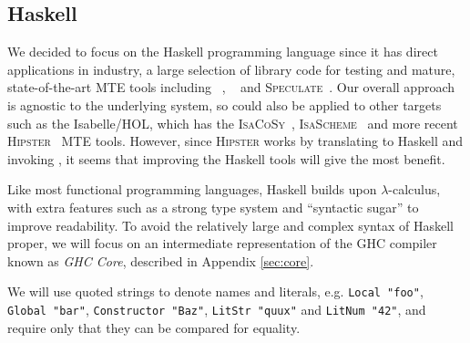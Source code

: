\subsection{Haskell}
\label{sec:haskell}

We decided to focus on the Haskell programming language since it has direct
applications in industry, a large selection of library code for testing and
mature, state-of-the-art MTE tools including \qspec{}~\cite{QuickSpec},
\hspec{}~\cite{claessen2013automating} and
\textsc{Speculate}~\cite{braquehais2017speculate}. Our overall approach is
agnostic to the underlying system, so could also be applied to other targets
such as the Isabelle/HOL, which has the
\textsc{IsaCoSy}~\cite{johansson2009isacosy}, \textsc{IsaScheme}~\cite{omar} and
more recent \textsc{Hipster}~\cite{Hipster} MTE tools. However, since
\textsc{Hipster} works by translating to Haskell and invoking \hspec{}, it seems
that improving the Haskell tools will give the most benefit.

Like most functional programming languages, Haskell builds upon
$\lambda$-calculus, with extra features such as a strong type system and
``syntactic sugar'' to improve readability. To avoid the relatively large and
complex syntax of Haskell proper, we will focus on an intermediate
representation of the \textsc{GHC} compiler known as \emph{GHC Core}, described
in Appendix \ref{sec:core}.

We will use quoted strings to denote names and literals, e.g. \texttt{Local
  "foo"}, \texttt{Global "bar"}, \texttt{Constructor "Baz"}, \texttt{LitStr
  "quux"} and \texttt{LitNum "42"}, and require only that they can be compared
for equality.


